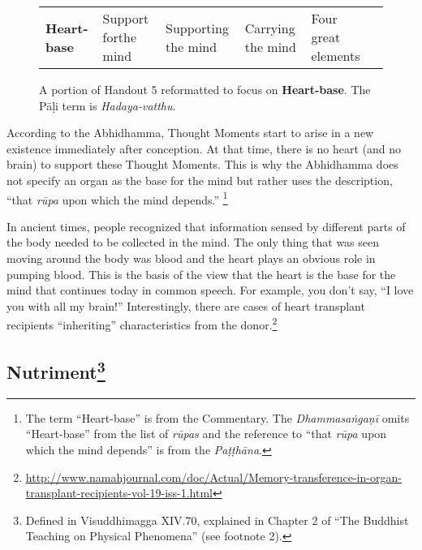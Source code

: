 \begin{figure} [H]
\setlength{\tabcolsep}{0pt}
\renewcommand{\arraystretch}{1.1}
\noindent\begin{tabular}{P{0.25\textwidth} | C{.185\textwidth} C{0.185\textwidth} C{0.185\textwidth} C{0.195\textwidth} m{0mm}}
\toprule
 &  &  &  & \\
\midrule
\textbf{Heart-base} & Support for\newline the mind & Supporting the mind & Carrying the mind & Four great elements &\\[9mm]
\bottomrule
\end{tabular} 
\caption{A portion of Handout 5 reformatted to focus on \textbf{Heart-base}. The Pāḷi term is \textit{Hadaya-vatthu}.}
\end{figure}

According to the Abhidhamma, Thought Moments start to arise in a new existence immediately after conception. At that time, there is no heart (and no brain) to support these Thought Moments. This is why the Abhidhamma does not specify an organ as the base for the mind but rather uses the description, “that \textit{rūpa} upon which the mind depends.” \footnote{The term “Heart-base” is from the Commentary. The \textit{Dhammasaṅgaṇī} omits “Heart-base” from the list of \textit{rūpas} and the reference to “that \textit{rūpa} upon which the mind depends” is from the \textit{Paṭṭhāna}.}

In ancient times, people recognized that information sensed by different parts of the body needed to be collected in the mind. The only thing that was seen moving around the body was blood and the heart plays an obvious role in pumping blood. This is the basis of the view that the heart is the base for the mind that continues today in common speech. For example, you don’t say, “I love you with all my brain!” Interestingly, there are cases of heart transplant recipients “inheriting” characteristics from the donor.\footnote{\url{http://www.namahjournal.com/doc/Actual/Memory-transference-in-organ-transplant-recipients-vol-19-iss-1.html}}

\subsection*{Nutriment\footnote{Defined in Visuddhimagga XIV.70, explained in Chapter 2 of “The Buddhist Teaching on Physical Phenomena” (see footnote 2). }}

